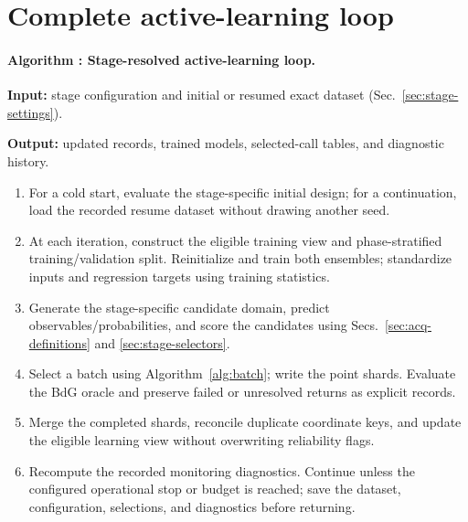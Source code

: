 \section{Complete active-learning loop}
\label{alg:loop}\paragraph{Algorithm \thealgorithm: Stage-resolved active-learning loop.}
\textbf{Input:} stage configuration and initial or resumed exact dataset (Sec.~\ref{sec:stage-settings}).\par\textbf{Output:} updated records, trained models, selected-call tables, and diagnostic history.
\begin{enumerate}
\item For a cold start, evaluate the stage-specific initial design; for a continuation, load the recorded resume dataset without drawing another seed.
\item At each iteration, construct the eligible training view and phase-stratified training/validation split. Reinitialize and train both ensembles; standardize inputs and regression targets using training statistics.
\item Generate the stage-specific candidate domain, predict observables/probabilities, and score the candidates using Secs.~\ref{sec:acq-definitions} and \ref{sec:stage-selectors}.
\item Select a batch using Algorithm~\ref{alg:batch}; write the point shards. Evaluate the BdG oracle and preserve failed or unresolved returns as explicit records.
\item Merge the completed shards, reconcile duplicate coordinate keys, and update the eligible learning view without overwriting reliability flags.
\item Recompute the recorded monitoring diagnostics. Continue unless the configured operational stop or budget is reached; save the dataset, configuration, selections, and diagnostics before returning.
\end{enumerate}


